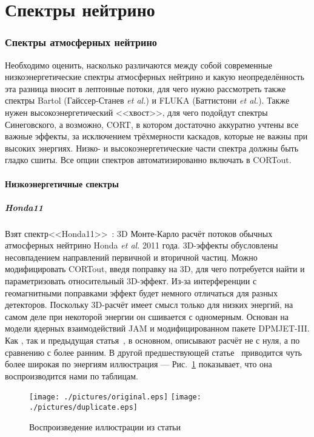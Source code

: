 \part{Спектры нейтрино}
\section{Спектры атмосферных нейтрино}
{\color{MYgreen}Необходимо оценить, насколько различаются между собой современные низкоэнергетические спектры атмосферных нейтрино и какую неопределённость эта разница вносит в лептонные потоки, для чего нужно рассмотреть также спектры Bartol (Гайссер-Станев \emph{et al.}) и FLUKA (Баттистони \emph{et al.}). Также нужен высокоэнергетический <<хвост>>, для чего подойдут спектры Синеговского, а возможно, CORT, в котором достаточно аккуратно учтены все важные эффекты, за исключением трёхмерности каскадов, которые не важны при высоких энергиях. Низко- и высокоэнергетические части спектра должны быть гладко сшиты. {\color{brown}Все опции спектров автоматизированно включать в CORTout.}}

\subsection{Низкоэнергетичные спектры}
\subsubsection{Honda11}
{\color{blue}Взят спектр<<Honda11>>}~\cite{Honda:2011nf}: 3D Монте-Карло расчёт потоков обычных атмосферных нейтрино Honda \emph{et al.} 2011 года. \textsf{3D-эффекты обусловлены несовпадением направлений первичной и вторичной частиц.} {\color{brown}Можно модифицировать CORTout, введя поправку на 3D, для чего потребуется найти и параметризовать относительный 3D-эффект.} \textsf{Из-за интерференции с геомагнитными поправками эффект будет немного отличаться для разных детекторов.} Поскольку 3D-расчёт имеет смысл только для низких энергий, на самом деле при некоторой энергии он сшивается с одномерным. {\color{brown}Основан на модели ядерных взаимодействий JAM и модифицированном пакете DPMJET-III.} Как \cite{Honda:2011nf}, так и предыдущая статья~\cite{Sanuki:2006yd}, в основном, описывают расчёт не с нуля, а по сравнению с более ранним. В другой предшествующей статье~\cite{Honda:2006qj} приводится  чуть более широкая по энергиям иллюстрация --- Рис.~\ref{comparison} показывает, что она воспроизводится нами по таблицам.
\begin{figure}[!ht]
\begin{center}
\texttt{[image: ./pictures/original.eps]}
\texttt{[image: ./pictures/duplicate.eps]}
\end{center}
\caption{Воспроизведение иллюстрации из статьи~\cite{Honda:2006qj}}
\label{comparison}
\end{figure}

